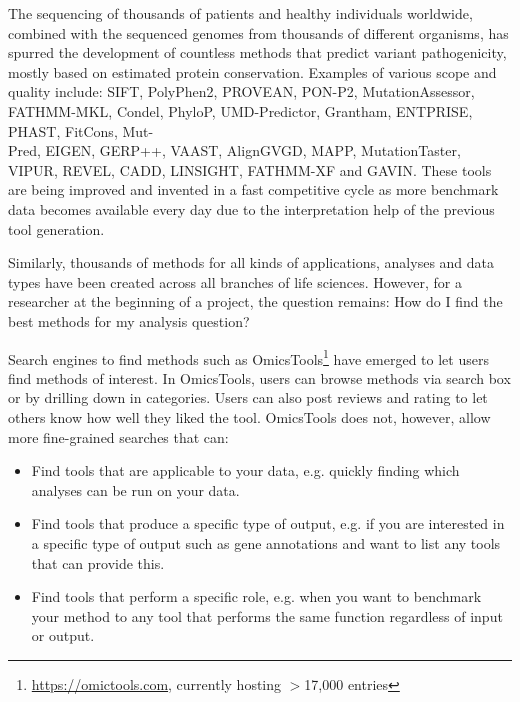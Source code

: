 The sequencing of thousands of patients and healthy individuals worldwide, combined with the sequenced genomes from thousands of different organisms, has spurred the development of countless methods that predict variant pathogenicity, mostly based on estimated protein conservation.
Examples of various scope and quality include: SIFT\cite{Kumar_2009}, Po\-ly\-Phen2\cite{Adzhubei_2010}, PRO\-VEAN\cite{Choi_2012}, PON-P2\cite{Niroula_2015}, Mu\-ta\-tion\-As\-ses\-sor\cite{Reva_2011}, FATH\-MM-MKL\cite{Shihab_2015}, Con\-del\cite{Gonz_lez_P_rez_2011}, Phy\-lo\-P\cite{Pollard_2009}, UMD\--Pre\-dic\-tor\cite{Fr_d_ric_2009}, Gran\-tham\cite{Grantham_1974}, ENT\-PRISE\cite{Zhou_2016}, PHAST\cite{Zhou_2011}, Fit\-Cons\cite{Gulko_2015}, Mut-\\Pred\cite{Li_2009}, EI\-GEN\cite{Ionita_Laza_2016}, GERP++\cite{Davydov_2010}, VAAST\cite{Kennedy_2014}, Align\-GV\-GD\cite{Tavtigian_2005}, MAPP\cite{Tavtigian_2008}, Mu\-ta\-tion\-Tas\-ter\cite{Schwarz_2014}, VI\-PUR\cite{Baugh_2015}, RE\-VEL\cite{Ioannidis_2016}, CADD\cite{Kircher_2014}, LIN\-SIGHT\cite{Huang_2017}, FATHMM-XF\cite{Rogers_2017} and GA\-VIN\cite{van_der_Velde_2017}.
These tools are being improved and invented in a fast competitive cycle as more benchmark data becomes available every day due to the interpretation help of the previous tool generation.

Similarly, thousands of methods for all kinds of applications, analyses and data types have been created across all branches of life sciences.
However, for a researcher at the beginning of a project, the question remains: How do I find the best methods for my analysis question? 

Search engines to find methods such as OmicsTools\footnote{\url{https://omictools.com}, currently hosting $>$17,000 entries} have emerged to let users find methods of interest.
In OmicsTools, users can browse methods via search box or by drilling down in categories.
Users can also post reviews and rating to let others know how well they liked the tool.
OmicsTools does not, however, allow more fine-grained searches that can:
\begin{itemize}
  \item Find tools that are applicable to your data, e.g. quickly finding which analyses can be run on your data.
  \item Find tools that produce a specific type of output, e.g. if you are interested in a specific type of output such as gene annotations and want to list any tools that can provide this.
  \item Find tools that perform a specific role, e.g. when you want to benchmark your method to any tool that performs the same function regardless of input or output.
\end{itemize}

